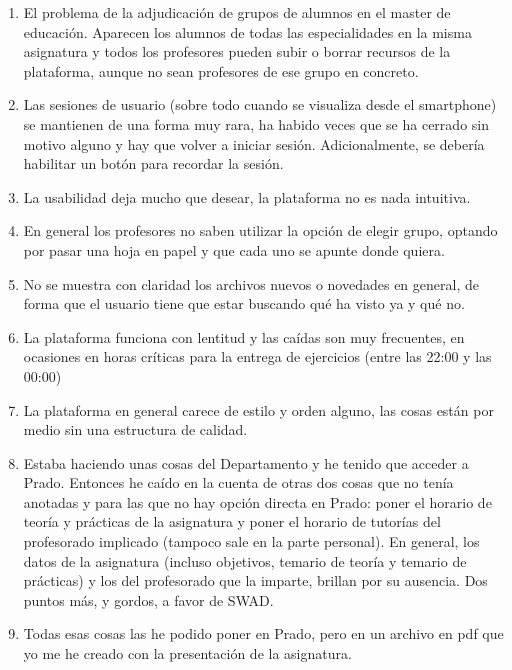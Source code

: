\begin{enumerate}
\item El problema de la adjudicación de grupos de alumnos en el master de educación. Aparecen los alumnos de todas las especialidades en la misma asignatura y todos los profesores pueden subir o borrar recursos de la plataforma, aunque no sean profesores de ese grupo en concreto.


\item Las sesiones de usuario (sobre todo cuando se visualiza desde el smartphone) se mantienen de una forma muy rara, ha habido veces que se ha cerrado sin motivo alguno y hay que volver a iniciar sesión. Adicionalmente, se debería habilitar un botón para recordar la sesión.

\item La usabilidad deja mucho que desear, la plataforma no es nada intuitiva.

\item En general los profesores no saben utilizar la opción de elegir grupo, optando por pasar una hoja en papel y que cada uno se apunte donde quiera.

\item No se muestra con claridad los archivos nuevos o novedades en general, de forma que el usuario tiene que estar buscando qué ha visto ya y qué no.

\item La plataforma funciona con lentitud y las caídas son muy frecuentes, en ocasiones en horas críticas para la entrega de ejercicios (entre las 22:00 y las 00:00)

\item La plataforma en general carece de estilo y orden alguno, las cosas están por medio sin una estructura de calidad.

\item Estaba haciendo unas cosas del Departamento y he tenido que acceder a Prado. Entonces he caído en la cuenta de otras dos cosas que no tenía anotadas y para las que no hay opción directa en Prado: poner el horario de teoría y prácticas de la asignatura y poner el horario de tutorías del profesorado implicado (tampoco sale en la parte personal). En general, los datos de la asignatura (incluso objetivos, temario de teoría y temario de prácticas) y los del profesorado que la imparte, brillan por su ausencia. Dos puntos más, y gordos, a favor de SWAD.

\item Todas esas cosas las he podido poner en Prado, pero en un archivo en pdf que yo me he creado con la presentación de la asignatura.
\end{enumerate}

